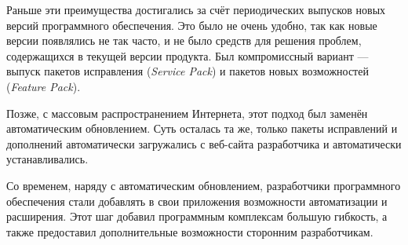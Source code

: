 Раньше эти преимущества достигались за счёт периодических выпусков новых версий программного обеспечения. Это было не очень удобно, так как новые версии появлялись не так часто, и не было средств для решения проблем, содержащихся в текущей версии продукта. Был компромиссный вариант --- выпуск пакетов исправления ({\it Service Pack}) и пакетов новых возможностей ({\it Feature Pack}). 

Позже, с массовым распространением Интернета, этот подход был заменён автоматическим обновлением. Суть осталась та же, только  пакеты исправлений и дополнений автоматически загружались с веб-сайта разработчика и автоматически устанавливались. 

Со временем, наряду с автоматическим обновлением, разработчики программного обеспечения стали добавлять в свои приложения возможности автоматизации и расширения. Этот шаг добавил программным комплексам большую гибкость, а также предоставил дополнительные возможности сторонним разработчикам. 

\pagebreak